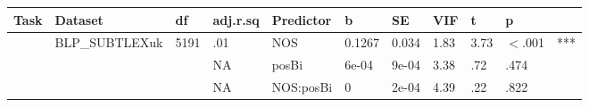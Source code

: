 \begin{table}[ht]
\centering
\begingroup\normalsize
\begin{tabular}{lllllllllll}
  \hline
Task & Dataset & df & adj.r.sq & Predictor & b & SE & VIF & t & p &  \\ 
  \hline
 & BLP\_SUBTLEXuk & 5191 & .01 & NOS & 0.1267 & 0.034 & 1.83 & 3.73 & $<$.001 & *** \\ 
   &  &  & NA & posBi & 6e-04 & 9e-04 & 3.38 & .72 & .474 &   \\ 
   &  &  & NA & NOS:posBi & 0 & 2e-04 & 4.39 & .22 & .822 &   \\ 
   \hline
\end{tabular}
\endgroup
\end{table}
